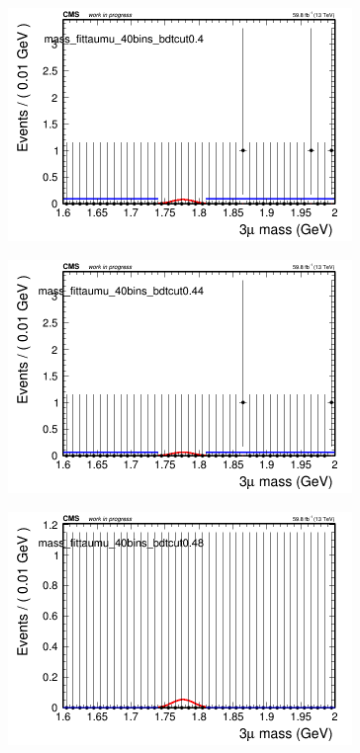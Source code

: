 \begin{figure}[H]
\begin{subfigure}{0.2\textwidth}
        \caption{}
    \end{subfigure}
    \begin{subfigure}{0.2\textwidth}
        \includegraphics[width=\textwidth]{flat_fit/plots/taumu/massfit_taumu_40bins_bdtcut0.4.png}
        \caption{}
    \end{subfigure}
    \begin{subfigure}{0.2\textwidth}
        \includegraphics[width=\textwidth]{flat_fit/plots/taumu/massfit_taumu_40bins_bdtcut0.44.png}
        \caption{}
    \end{subfigure}
    \begin{subfigure}{0.2\textwidth}
        \includegraphics[width=\textwidth]{flat_fit/plots/taumu/massfit_taumu_40bins_bdtcut0.48.png}

\end{subfigure}
\end{figure}
